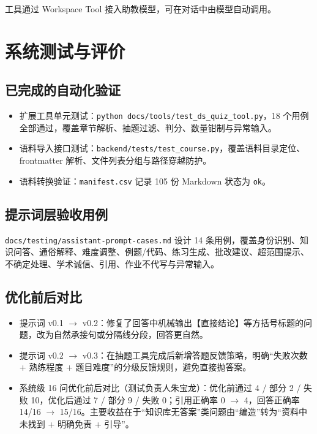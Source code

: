 \documentclass[12pt,a4paper]{ctexart}
\begin{document}
工具通过 Workspace Tool 接入助教模型，可在对话中由模型自动调用。

\section{系统测试与评价}

\subsection{已完成的自动化验证}

\begin{itemize}
  \item 扩展工具单元测试：\texttt{python docs/tools/test\_ds\_quiz\_tool.py}，18 个用例全部通过，覆盖章节解析、抽题过滤、判分、数量钳制与异常输入。
  \item 语料导入接口测试：\texttt{backend/tests/test\_course.py}，覆盖语料目录定位、frontmatter 解析、文件列表分组与路径穿越防护。
  \item 语料转换验证：\texttt{manifest.csv} 记录 105 份 Markdown 状态为 \texttt{ok}。
\end{itemize}

\subsection{提示词层验收用例}

\texttt{docs/testing/assistant-prompt-cases.md} 设计 14 条用例，覆盖身份识别、知识问答、通俗解释、难度调整、例题/代码、练习生成、批改建议、超范围提示、不确定处理、学术诚信、引用、作业不代写与异常输入。

\subsection{优化前后对比}

\begin{itemize}
  \item 提示词 v0.1 $\rightarrow$ v0.2：修复了回答中机械输出【直接结论】等方括号标题的问题，改为自然承接句或分隔线分段，回答更自然。
  \item 提示词 v0.2 $\rightarrow$ v0.3：在抽题工具完成后新增答题反馈策略，明确“失败次数 + 熟练程度 + 题目难度”的分级反馈规则，避免直接抛答案。
  \item 系统级 16 问优化前后对比（测试负责人朱宝龙）：优化前通过 4 / 部分 2 / 失败 10，优化后通过 7 / 部分 9 / 失败 0；引用正确率 0 $\rightarrow$ 4，回答正确率 14/16 $\rightarrow$ 15/16。主要收益在于“知识库无答案”类问题由“编造”转为“资料中未找到 + 明确免责 + 引导”。
\end{itemize}
\end{document}
